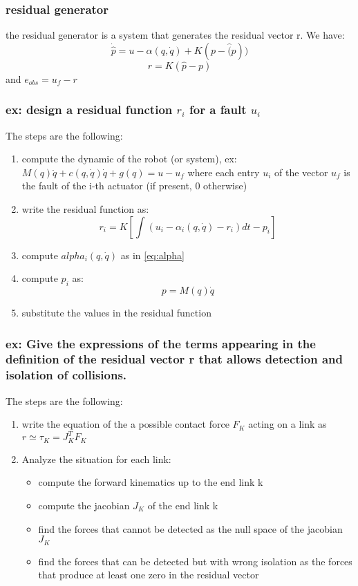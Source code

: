 \documentclass[a4paper,12pt]{article}
\begin{document}
\subsubsection{residual generator}
the residual generator is a system that generates
 the residual vector r.
We have:
\begin{equation}
\dot{\hat{p}}=u - \alpha(q,\dot{q}) + K(p- \hat(p))
\end{equation}
\begin{equation}
    r=K(\hat{p}-p)
\end{equation}
and $e_{obs}=u_f - r$

\subsubsection{ex: design a residual function $r_i$ for a fault $u_i$}
The steps are the following:
\begin{enumerate}
    \item compute the dynamic of the robot (or system), ex: 
    $M(q)\ddot{q}+c(q,\dot{q})\dot{q}+g(q)=u - u_f$
    where each entry $u_i$ of the vector $u_f$ is the fault
    of the i-th actuator (if present, 0 otherwise)
    \item write the residual function as: \begin{equation}
    r_i=K[\int(u_i-\alpha_i(q,\dot{q})-r_i)dt-p_i]
    \end{equation}
    \item compute $alpha_i(q,\dot{q})$ as in \ref{eq:alpha}
    \item compute $p_i$ as: \begin{equation}
    p=M(q)\dot{q}
    \end{equation}
    \item substitute the values in the residual function
\end{enumerate}

\subsubsection{ex: Give the
 expressions of the terms appearing in the 
 definition of the residual vector r 
that allows detection and isolation of collisions.
}
The steps are the following:
\begin{enumerate}
    \item write the equation of the a possible 
    contact force $F_K$ acting on a link as 
    $r \simeq \tau_K=J_K^TF_K$
    \item Analyze the situation for each link:\begin{itemize}
    \item compute the forward kinematics up to the end link k 
    \item compute the jacobian $J_K$ of the end link k
    \item find the forces that cannot be detected 
    as the null space of the jacobian $J_K$
    \item find the forces that can be detected but 
    with wrong isolation as the forces that produce 
    at least one zero in the residual vector
    \end{itemize}
\end{enumerate}
\end{document}
